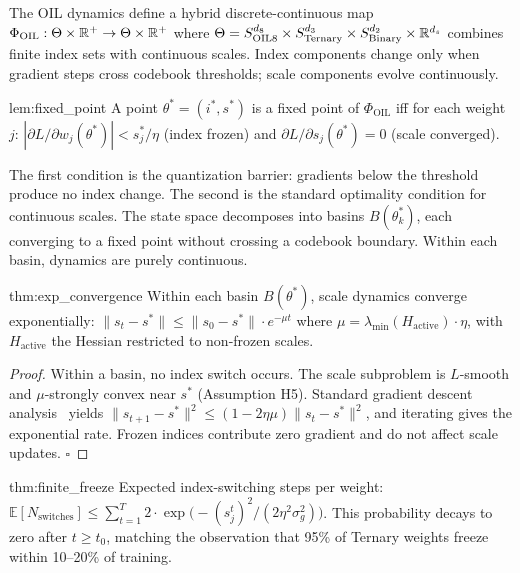 The OIL dynamics define a hybrid discrete-continuous map $\Phi_{\text{OIL}}
: \Theta \times \mathbb{R}^+ \to \Theta \times \mathbb{R}^+$ where $\Theta =
S_{\text{OIL8}}^{d_8} \times S_{\text{Ternary}}^{d_3} \times
S_{\text{Binary}}^{d_2} \times \mathbb{R}^{d_s}$ combines finite index sets
with continuous scales.  Index components change only when gradient steps
cross codebook thresholds; scale components evolve continuously.

\begin{mylemma}{lem:fixed_point}
A point $\theta^* = (i^*, s^*)$ is a fixed point of $\Phi_{\text{OIL}}$
iff for each weight $j$: $|\partial L / \partial w_j (\theta^*)| <
s_j^* / \eta$ (index frozen) and $\partial L / \partial s_j (\theta^*)
= 0$ (scale converged).
\end{mylemma}

The first condition is the quantization barrier: gradients below the
threshold produce no index change.  The second is the standard optimality
condition for continuous scales.  The state space decomposes into basins
$B(\theta_k^*)$, each converging to a fixed point without crossing a
codebook boundary.  Within each basin, dynamics are purely continuous.

\begin{mythm}{thm:exp_convergence}
Within each basin $B(\theta^*)$, scale dynamics converge exponentially:
$\|s_t - s^*\| \leq \|s_0 - s^*\| \cdot e^{-\mu t}$ where $\mu =
\lambda_{\min}(H_{\text{active}}) \cdot \eta$, with $H_{\text{active}}$
the Hessian restricted to non-frozen scales.
\end{mythm}

\begin{proof}
Within a basin, no index switch occurs.  The scale subproblem is
$L$-smooth and $\mu$-strongly convex near $s^*$ (Assumption H5).
Standard gradient descent analysis~\cite{boyd2004} yields $\|s_{t+1} -
s^*\|^2 \leq (1 - 2\eta\mu) \|s_t - s^*\|^2$, and iterating gives the
exponential rate.  Frozen indices contribute zero gradient and do not
affect scale updates. $\square$
\end{proof}

\begin{mycor}{thm:finite_freeze}
Expected index-switching steps per weight: $\mathbb{E}[N_{\text{switches}}]
\leq \sum_{t=1}^T 2 \cdot \exp\bigl(-(s_j^t)^2 / (2\eta^2 \sigma_g^2)
\bigr)$.  This probability decays to zero after $t \geq t_0$, matching
the observation that 95\% of Ternary weights freeze within 10--20\% of
training.
\end{mycor}

